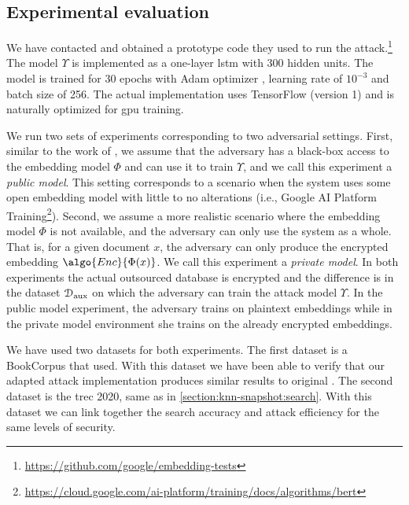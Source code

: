 		\subsection{Experimental evaluation}\label{section:knn-snapshot:attacks:experiments}

			We have contacted \textcite{embedding-attacks} and obtained a prototype code they used to run the attack.\footnote{
				\url{https://github.com/google/embedding-tests}
			}
			The model $\Upsilon$ is implemented as a one-layer \acrshort{lstm} with \num{300} hidden units.
			The model is trained for 30 epochs with Adam optimizer \cite{adam-optimizer}, learning rate of $10^{-3}$ and batch size of 256.
			The actual implementation uses TensorFlow \cite{tensorflow} (version 1) and is naturally optimized for \acrshort{gpu} training.

			We run two sets of experiments corresponding to two adversarial settings.
			First, similar to the work of \textcite{embedding-attacks}, we assume that the adversary has a black-box access to the embedding model $\Phi$ and can use it to train $\Upsilon$, and we call this experiment a \emph{public model}.
			This setting corresponds to a scenario when the system uses some open embedding model with little to no alterations (i.e., Google AI Platform Training\footnote{
				\url{https://cloud.google.com/ai-platform/training/docs/algorithms/bert}
			}).
			Second, we assume a more realistic scenario where the embedding model $\Phi$ is not available, and the adversary can only use the system as a whole.
			That is, for a given document $x$, the adversary can only produce the encrypted embedding $\algo{Enc}{\Phi(x)}$.
			We call this experiment a \emph{private model}.
			In both experiments the actual outsourced database is encrypted and the difference is in the dataset $\mathcal{D}_\text{aux}$ on which the adversary can train the attack model $\Upsilon$.
			In the public model experiment, the adversary trains on plaintext embeddings while in the private model environment she trains on the already encrypted embeddings.

			We have used two datasets for both experiments.
			The first dataset is a BookCorpus \cite{bookcorpus} that \textcite{embedding-attacks} used.
			With this dataset we have been able to verify that our adapted attack implementation produces similar results to original \cite{embedding-attacks}.
			The second dataset is the \acrshort{trec} 2020, same as in \cref{section:knn-snapshot:search}.
			With this dataset we can link together the search accuracy and attack efficiency for the same levels of security.

